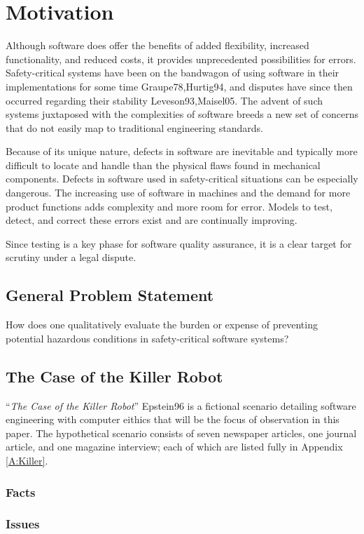 \chapter{Motivation}\label{C:Motivation}

Although software does offer the benefits of added flexibility, increased
functionality, and reduced costs, it provides unprecedented possibilities for
errors. Safety-critical systems have been on the bandwagon of using software in
their implementations for some time \cite{refs}{Graupe78,Hurtig94}, and disputes have
since then occurred regarding their stability \cite{refs}{Leveson93,Maisel05}. The 
advent of such systems juxtaposed with the complexities of software breeds a new
set of concerns that do not easily map to traditional engineering standards.

Because of its unique nature, defects in software are inevitable and typically
more difficult to locate and handle than the physical flaws found in mechanical
components. Defects in software used in safety-critical situations can be
especially dangerous. The increasing use of software in machines and the demand
for more product functions adds complexity and more room for error. Models to
test, detect, and correct these errors exist and are continually improving.

Since testing is a key phase for software quality assurance, it is a clear
target for scrutiny under a legal dispute.

\section{General Problem Statement}
How does one qualitatively evaluate the burden or expense of preventing
potential hazardous conditions in safety-critical software systems?

\section{The Case of the Killer Robot}
``\textit{The Case of the Killer Robot}'' \cite{refs}{Epstein96} is a fictional  
scenario detailing software engineering with computer eithics that will be the
focus of observation in this paper. The hypothetical scenario consists of seven
newspaper articles, one journal article, and one magazine interview; each of
which are listed fully in Appendix \ref{A:Killer}.

\subsection{Facts}

\subsection{Issues}
